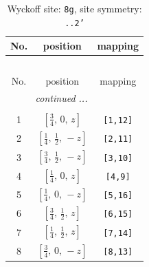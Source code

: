 \documentclass[fleqn,8pt]{jsarticle}
\begin{document}
\renewcommand{\arraystretch}{1.2}
\begin{longtable}{ccc}
\caption{Wyckoff site: {\tt 8g}, site symmetry: {\tt ..2'}}
 \\
 \hline \hline
No. & position & mapping \\ \hline \endfirsthead

\multicolumn{2}{l}{\tablename\ \thetable{}} \\
 \hline \hline
No. & position & mapping \\ \hline \endhead

 \hline \hline
\multicolumn{2}{r}{\footnotesize\it continued ...} \\ \endfoot

 \hline \hline
\multicolumn{2}{r}{} \\ \endlastfoot

1 & $\left[ \frac{3}{4},\, 0,\, z \right]$ & {\tt [1,12]} \\ \hline
2 & $\left[ \frac{1}{4},\, \frac{1}{2},\, - z \right]$ & {\tt [2,11]} \\ \hline
3 & $\left[ \frac{3}{4},\, \frac{1}{2},\, - z \right]$ & {\tt [3,10]} \\ \hline
4 & $\left[ \frac{1}{4},\, 0,\, z \right]$ & {\tt [4,9]} \\ \hline
5 & $\left[ \frac{1}{4},\, 0,\, - z \right]$ & {\tt [5,16]} \\ \hline
6 & $\left[ \frac{3}{4},\, \frac{1}{2},\, z \right]$ & {\tt [6,15]} \\ \hline
7 & $\left[ \frac{1}{4},\, \frac{1}{2},\, z \right]$ & {\tt [7,14]} \\ \hline
8 & $\left[ \frac{3}{4},\, 0,\, - z \right]$ & {\tt [8,13]} \\
\end{longtable}
\renewcommand{\arraystretch}{1.2}
\end{document}
